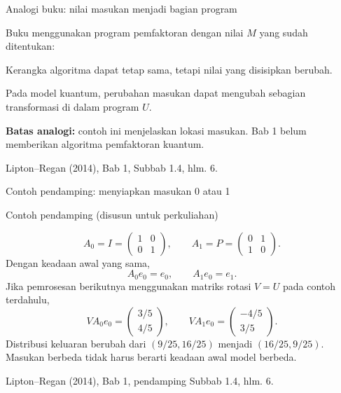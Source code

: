 \documentclass[aspectratio=169,11pt]{beamer}
\newcommand{\bookref}[1]{\par\vfill{\scriptsize\color{gray}Lipton--Regan (2014), Bab 1, #1.}}
\newcommand{\extra}{\par\textcolor{AcademicBlue}{\small Contoh pendamping (disusun untuk perkuliahan)}\par}
\begin{document}
\begin{frame}{Analogi buku: nilai masukan menjadi bagian program}

Buku menggunakan program pemfaktoran dengan nilai $M$ yang sudah ditentukan:
\begin{center}
\end{center}
Kerangka algoritma dapat tetap sama, tetapi nilai yang disisipkan berubah.
\par\medskip
Pada model kuantum, perubahan masukan dapat mengubah sebagian transformasi di dalam program $U$.
\par\medskip
\textbf{Batas analogi:} contoh ini menjelaskan lokasi masukan. Bab 1 belum memberikan algoritma pemfaktoran kuantum.
\bookref{Subbab 1.4, hlm. 6}

\end{frame}

\begin{frame}{Contoh pendamping: menyiapkan masukan 0 atau 1}

\extra
\[
 A_0=I=\begin{pmatrix}1&0\\0&1\end{pmatrix},\qquad
 A_1=P=\begin{pmatrix}0&1\\1&0\end{pmatrix}.
\]
Dengan keadaan awal yang sama,
\[
 A_0e_0=e_0,\qquad A_1e_0=e_1.
\]
Jika pemrosesan berikutnya menggunakan matriks rotasi $V=U$ pada contoh terdahulu,
\[
 VA_0e_0=\begin{pmatrix}3/5\\4/5\end{pmatrix},\qquad
 VA_1e_0=\begin{pmatrix}-4/5\\3/5\end{pmatrix}.
\]
Distribusi keluaran berubah dari $(9/25,16/25)$ menjadi $(16/25,9/25)$. Masukan berbeda tidak harus berarti keadaan awal model berbeda.
\bookref{pendamping Subbab 1.4, hlm. 6}

\end{frame}
\end{document}
